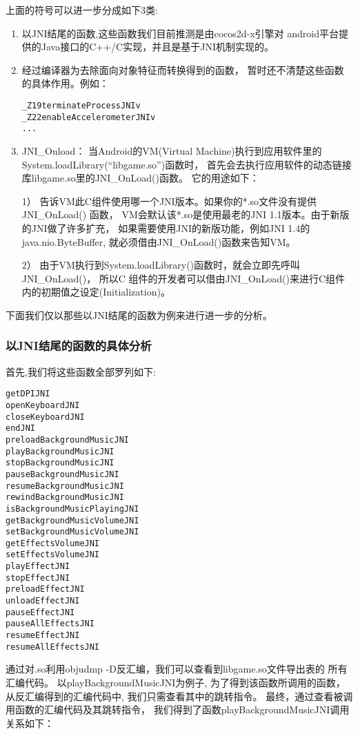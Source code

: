 上面的符号可以进一步分成如下3类:
\begin{enumerate}
\item 以JNI结尾的函数,这些函数我们目前推测是由cocos2d-x引擎对
android平台提供的Java接口的C++/C实现，并且是基于JNI机制实现的。
\item 经过编译器为去除面向对象特征而转换得到的函数，
暂时还不清楚这些函数的具体作用。例如：
\begin{lstlisting}
_Z19terminateProcessJNIv
_Z22enableAccelerometerJNIv
...
\end{lstlisting}
\item JNI\_Onload：
当Android的VM(Virtual Machine)执行到应用软件里的 
System.loadLibrary(``libgame.so'')函数时，
首先会去执行应用软件的动态链接库libgame.so里的JNI\_OnLoad()函数。
它的用途如下：

1） 告诉VM此C组件使用哪一个JNI版本。如果你的*.so文件没有提供JNI\_OnLoad() 函数，
    VM会默认该*.so是使用最老的JNI 1.1版本。由于新版的JNI做了许多扩充，
    如果需要使用JNI的新版功能，例如JNI 1.4的 java.nio.ByteBuffer, 
    就必须借由JNI\_OnLoad()函数来告知VM。

2） 由于VM执行到System.loadLibrary()函数时，就会立即先呼叫JNI\_OnLoad()，
    所以C 组件的开发者可以借由JNI\_OnLoad()来进行C组件内的初期值之设定(Initialization)。\\
\end{enumerate}

下面我们仅以那些以JNI结尾的函数为例来进行进一步的分析。

\subsubsection{以JNI结尾的函数的具体分析}
首先,我们将这些函数全部罗列如下:
\begin{lstlisting}
getDPIJNI
openKeyboardJNI
closeKeyboardJNI
endJNI
preloadBackgroundMusicJNI
playBackgroundMusicJNI
stopBackgroundMusicJNI
pauseBackgroundMusicJNI
resumeBackgroundMusicJNI
rewindBackgroundMusicJNI
isBackgroundMusicPlayingJNI
getBackgroundMusicVolumeJNI
setBackgroundMusicVolumeJNI
getEffectsVolumeJNI
setEffectsVolumeJNI
playEffectJNI
stopEffectJNI
preloadEffectJNI
unloadEffectJNI
pauseEffectJNI
pauseAllEffectsJNI
resumeEffectJNI
resumeAllEffectsJNI
\end{lstlisting}

通过对.so利用objudmp -D反汇编，我们可以查看到libgame.so文件导出表的
所有汇编代码。
以playBackgroundMusicJNI为例子,
为了得到该函数所调用的函数，
从反汇编得到的汇编代码中,
我们只需查看其中的跳转指令。
最终，通过查看被调用函数的汇编代码及其跳转指令，
我们得到了函数playBackgroundMusicJNI调用关系如下：

